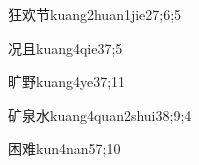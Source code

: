 \begin{verbete}{狂欢节}{kuang2huan1jie2}{7;6;5}
\end{verbete}

\begin{verbete}{况且}{kuang4qie3}{7;5}
\end{verbete}

\begin{verbete}{旷野}{kuang4ye3}{7;11}
\end{verbete}

\begin{verbete}{矿泉水}{kuang4quan2shui3}{8;9;4}
\end{verbete}

\begin{verbete}{困难}{kun4nan5}{7;10}
\end{verbete}


